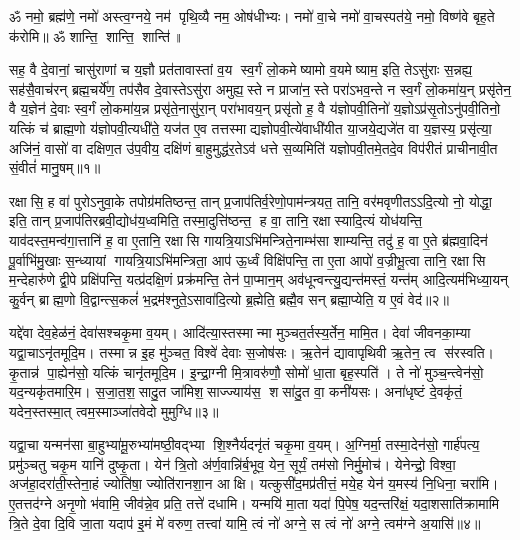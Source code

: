 
\setcounter{anuvakam}{0}
ॐ नमो॒ ब्रह्म॑णे॒ नमो॑ अस्त्व॒ग्नये॒ नम॑ पृथि॒व्यै नम॒ ओष॑धीभ्यः। नमो॑ वा॒चे नमो॑ वा॒चस्पत॑ये॒ नमो॒ विष्ण॑वे बृह॒ते क॑रोमि॥
ॐ शान्ति॒ शान्ति॒ शान्ति॑॥

सह॒ वै दे॒वानां॒ चासु॑राणां च य॒ज्ञौ प्रत॑तावास्तां व॒य स्व॒र्गं लो॒कमेष्यामो व॒यमेष्याम॒ इति॒ तेऽसु॑राः स॒न्नह्य॒ सह॑सै॒वाच॑रन् ब्रह्म॒चर्ये॑ण॒ तप॑सैव दे॒वास्तेऽसु॑रा अमुह्य॒स्ते न प्राजा॑न॒स्ते परा॑ऽभव॒न्ते न स्व॒र्गं लो॒कमा॑य॒न् प्रसृ॑तेन॒ वै य॒ज्ञेन॑ दे॒वाः स्व॒र्गं लो॒कमा॑य॒न्न प्रसृ॑ते॒नासु॑रा॒न् परा॑भावय॒न् प्रसृ॑तो ह॒ वै य॑ज्ञोपवी॒तिनो॑ य॒ज्ञोऽप्र॑सृ॒तोऽनु॑पवी॒तिनो॒ यत्किं च॑ ब्राह्म॒णो य॑ज्ञोपवी॒त्यधी॑ते॒ यज॑त ए॒व तत्तस्माद्यज्ञोपवी॒त्ये॑वाधी॑यीत या॒जये॒द्यजे॑त वा य॒ज्ञस्य॒ प्रसृ॑त्या॒ अजि॑नं॒ वासो॑ वा दक्षिण॒त उ॑प॒वीय॒ दक्षि॑णं बा॒हुमुद्ध॑र॒तेऽव॑ धत्ते स॒व्यमिति॑ यज्ञोपवी॒तमे॒तदे॒व विप॑रीतं प्राचीनावी॒त सं॒वीतं॑ मानु॒षम्॥१॥\anuvakamend

रक्षासि॒ ह वा॑ पुरोऽनुवा॒के तपोग्र॑मतिष्ठन्त॒ तान् प्र॒जाप॑तिर्व॒रेणो॒पा\-म॑न्त्रयत॒ तानि॒ वर॑मवृणीतऽऽदि॒त्यो नो॒ योद्धा॒ इति॒ तान् प्र॒जाप॑तिरब्रवी॒द्योध॑य॒ध्वमिति॒ तस्मा॒दुत्ति॑ष्ठन्त॒ ह वा॒ तानि॒ रक्षास्यादि॒त्यं योध॑यन्ति॒ याव॑दस्त॒मन्व॑गा॒त्तानि॑ ह॒ वा ए॒तानि॒ रक्षासि गायत्रि॒याऽभि॑मन्त्रिते॒नाम्भ॑सा शाम्यन्ति॒ तदु॑ ह॒ वा ए॒ते ब्र॑ह्मवा॒दिन॑ पू॒र्वाभि॑मु॒खाः स॒न्ध्यायां गायत्रि॒याऽभि॑मन्त्रिता॒ आप॑ ऊ॒र्ध्वं विक्षि॑पन्ति॒ ता ए॒ता आपो॑ व॒ज्रीभू॒त्वा तानि॒ रक्षासि म॒न्देहारु॑णे द्वी॒पे प्रक्षि॑पन्ति॒ यत्प्र॑दक्षि॒णं प्रक्र॑मन्ति॒ तेन॑ पा॒प्मान॒म् अव॑धून्वन्त्यु॒द्यन्त॑मस्तं॒ यन्त॑म् आदि॒त्यम॑भिध्या॒यन् कु॒र्वन् ब्राह्म॒णो वि॒द्वान्त्स॒कलं॑ भ॒द्रम॑श्नुते॒ऽसावा॑दि॒त्यो ब्र॒ह्मेति॒ ब्रह्मै॒व सन् ब्रह्मा॒प्येति॒ य ए॒वं वेद॑॥२॥\anuvakamend

यद्दे॑वा देव॒हेळ॑नं॒ देवा॑सश्चकृ॒मा व॒यम्। आदि॑त्या॒स्तस्मान्मा मुञ्चत॒र्तस्य॒र्तेन॒ मामि॒त। देवा॑ जीवनका॒म्या यद्वा॒चाऽनृ॑त\-मूदि॒म। तस्मान्न इ॒ह मु॑ञ्चत॒ विश्वे॑ देवाः स॒जोष॑सः। ऋ॒तेन॑ द्यावापृथिवी ऋ॒तेन॒ त्व स॑रस्वति। कृ॒तान्न॑ पा॒ह्येन॑सो॒ यत्किं चानृ॑त\-मूदि॒म। इ॒न्द्रा॒ग्नी मि॒त्रावरु॑णौ॒ सोमो॑ धा॒ता बृह॒स्पति॑। ते नो॑ मुञ्च॒न्त्वेन॑सो॒ यद॒न्यकृ॑तमारि॒म। स॒जा॒त॒श॒सादु॒त जा॑मिश॒साज्ज्याय॑स॒ शसा॑दु॒त वा॒ कनी॑यसः। अना॑धृष्टं दे॒वकृ॑तं॒ यदेन॒स्तस्मा॒त् त्वम॒स्माञ्जा॑तवेदो मुमुग्धि॥३॥

यद्वा॒चा यन्मन॑सा बा॒हुभ्या॑मू॒रुभ्या॑मष्ठी॒वद्भ्या शि॒श्नैर्यदनृ॑तं चकृ॒मा व॒यम्। अ॒ग्निर्मा॒ तस्मा॒देन॑सो॒ गार्\mbox{}ह॑पत्य॒ प्रमु॑ञ्चतु चकृ॒म यानि॑ दुष्कृ॒ता। येन॑ त्रि॒तो अ॑र्ण॒वान्नि॑र्ब॒भूव॒ येन॒ सूर्यं॒ तम॑सो निर्मु॒मोच॑। येनेन्द्रो॒ विश्वा॒ अज॑हा॒दरा॑ती॒स्तेना॒हं ज्योति॑षा॒ ज्योति॑रानशा॒न आक्षि। यत्कुसी॑द॒मप्र॑तीत्तं॒ मये॒ह येन॑ य॒मस्य॑ नि॒धिना॒ चरा॑मि। ए॒तत्तद॑ग्ने अनृ॒णो भ॑वामि॒ जीव॑न्ने॒व प्रति॒ तत्ते॑ दधामि। यन्मयि॑ मा॒ता यदा॑ पि॒पेष॒ यद॒न्तरि॑क्षं॒ यदा॒शसाति॑क्रामामि त्रि॒ते दे॒वा दि॒वि जा॒ता यदाप॑ इ॒मं मे॑ वरुण॒ तत्त्वा॑ यामि॒ त्वं नो॑ अग्ने॒ स त्वं नो॑ अग्ने॒ त्वम॑ग्ने अ॒यासि॑॥४॥\anuvakamend


